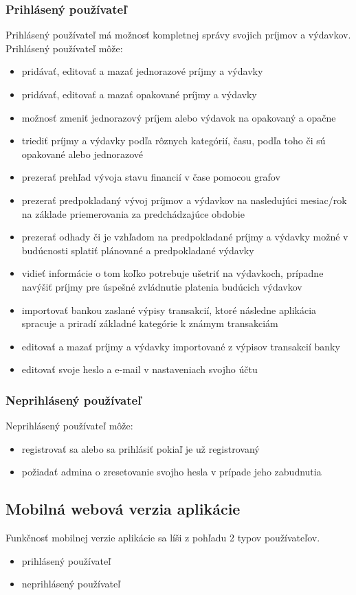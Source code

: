 \documentclass[12pt,onesided]{book}
\begin{document}
\subsubsection{Prihlásený používateľ}
Prihlásený používateľ má možnosť kompletnej správy svojich príjmov a výdavkov.
Prihlásený používateľ môže:
\begin{itemize}
\item{pridávať, editovať a mazať jednorazové príjmy a výdavky}
\item{pridávať, editovať a mazať opakované príjmy a výdavky}
\item{možnosť zmeniť jednorazový príjem alebo výdavok na opakovaný a opačne}
\item{triediť príjmy a výdavky podľa rôznych kategórií, času, podľa toho či sú opakované alebo jednorazové}
\item{prezerať prehľad vývoja stavu financií v čase pomocou grafov}
\item{prezerať  predpokladaný vývoj príjmov a výdavkov na nasledujúci mesiac/rok na základe priemerovania za predchádzajúce obdobie}
\item{prezerať odhady či je vzhľadom na predpokladané príjmy a výdavky možné v budúcnosti splatiť plánované a predpokladané výdavky}
\item{vidieť informácie o tom koľko potrebuje ušetriť na výdavkoch, prípadne navýšiť príjmy pre úspešné zvládnutie platenia budúcich výdavkov}
\item{importovať bankou zaslané výpisy transakcií, ktoré následne aplikácia spracuje a priradí základné kategórie k známym transakciám}
\item{editovať a mazať príjmy a výdavky importované z výpisov transakcií banky}
\item{editovať svoje heslo a e-mail v nastaveniach svojho účtu}
\end{itemize}

\subsubsection{Neprihlásený používateľ}
Neprihlásený používateľ môže:
\begin{itemize}
\item{registrovať sa alebo sa prihlásiť pokiaľ je už registrovaný}
\item{požiadať admina o zresetovanie svojho hesla v prípade jeho zabudnutia}
\end{itemize}
\subsection{Mobilná webová verzia aplikácie}
Funkčnosť mobilnej verzie aplikácie sa líši z pohľadu 2 typov používateľov.
\begin{itemize}
\item{prihlásený používateľ}
\item{neprihlásený používateľ}
\end{itemize}
\end{document}

